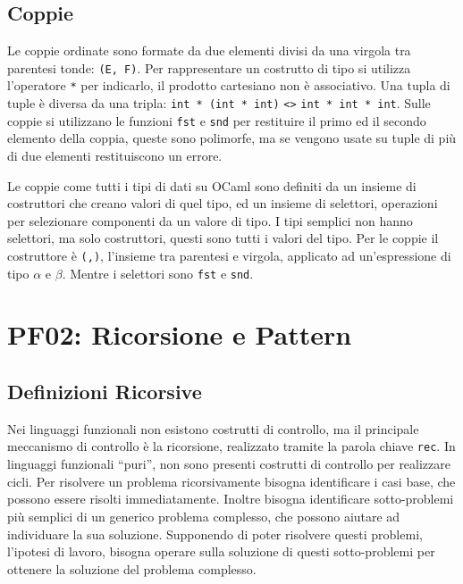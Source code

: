 \documentclass{article}
\numberwithin{equation}{subsection}
\begin{document}
\subsection{Coppie}

Le coppie ordinate sono formate da due elementi divisi da una virgola tra parentesi tonde: \verb|(E, F)|. Per rappresentare un costrutto di tipo si utilizza l'operatore \verb|*| per indicarlo, il prodotto cartesiano non è associativo. Una tupla di tuple è diversa da una tripla: \verb|int * (int * int)| \verb|<>| \verb|int * int * int|. 
Sulle coppie si utilizzano le funzioni \verb|fst| e \verb|snd| per restituire il primo ed il secondo elemento della coppia, queste sono polimorfe, ma se vengono usate su tuple di più di due elementi restituiscono un errore. 

Le coppie come tutti i tipi di dati su OCaml sono definiti da un insieme di costruttori che creano valori di quel tipo, ed un insieme di selettori, operazioni per selezionare componenti da un valore di tipo. 
I tipi semplici non hanno selettori, ma solo costruttori, questi sono tutti i valori del tipo. 
Per le coppie il costruttore è \verb|(,)|, l'insieme tra parentesi e virgola, applicato ad un'espressione di tipo $\alpha$ e $\beta$. Mentre i selettori sono \verb|fst| e \verb|snd|. 



\clearpage

\section{PF02: Ricorsione e Pattern}

\subsection{Definizioni Ricorsive}

Nei linguaggi funzionali non esistono costrutti di controllo, ma il principale meccanismo di controllo è la ricorsione, realizzato tramite la parola chiave \verb|rec|. 
In linguaggi funzionali ``puri'', non sono presenti costrutti di controllo per realizzare cicli. Per risolvere un problema ricorsivamente bisogna identificare i casi base, che possono essere risolti immediatamente. Inoltre bisogna identificare sotto-problemi più semplici di un generico problema complesso, che possono aiutare ad individuare la sua soluzione. Supponendo di poter risolvere questi problemi, l'ipotesi di lavoro, bisogna operare sulla soluzione di questi sotto-problemi per ottenere la soluzione del problema complesso. 
\end{document}
